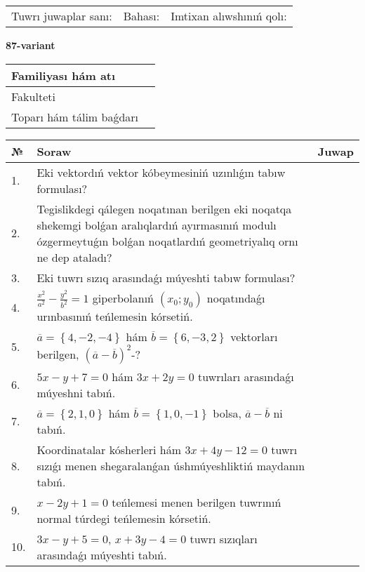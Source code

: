 \documentclass{article}
\begin{document}
\vspace{1cm}

\begin{tabular}{lll}
Tuwrı juwaplar sanı: \underline{\hspace{1.5cm}} & 
Bahası: \underline{\hspace{1.5cm}} & 
Imtixan alıwshınıń qolı: \underline{\hspace{2cm}} \\
\end{tabular}

\egroup

\newpage


\textbf{87-variant}\\

\bgroup
\def\arraystretch{1.6} %

\begin{tabular}{|m{5.7cm}|m{9.5cm}|}
\hline
Familiyası hám atı & \\
\hline
Fakulteti  & \\
\hline
Toparı hám tálim baǵdarı  & \\
\hline
\end{tabular}

\vspace{1cm}

\begin{tabular}{|m{0.7cm}|m{10cm}|m{4cm}|}
\hline
№ & Soraw & Juwap \\
\hline
1. & Eki vektordıń vektor kóbeymesiniń uzınlıǵın tabıw formulası? &  \\
\hline
2. & Tegislikdegi qálegen noqatınan berilgen eki noqatqa shekemgi bolǵan aralıqlardıń ayırmasınıń modulı ózgermeytuǵın bolǵan noqatlardıń geometriyalıq ornı ne dep ataladı? &  \\
\hline
3. & Eki tuwrı sızıq arasındaǵı múyeshti tabıw formulası? &  \\
\hline
4. & $\frac{x^2}{a^2}-\frac{y^2}{b^2}=1$ giperbolanıń $(x_0;y_0)$ noqatındaǵı urınbasınıń teńlemesin kórsetiń. &  \\
\hline
5. & $\overline{a}=\left\{ 4,-2,-4 \right\}$ hám $\overline{b}=\left\{ 6,-3, 2 \right\}$ vektorları berilgen, $(\overline{a}-\overline{b}) ^{2}$-? &  \\
\hline
6. & $5x-y+7=0$ hám $3x+2y=0$ tuwrıları arasındaǵı múyeshni tabıń. &  \\
\hline
7. & $\overline{a}=\left\{ 2, 1, 0 \right\}$ hám $\overline{b}=\left\{ 1, 0,-1 \right\}$ bolsa, $\overline{a}-\overline{b}$ ni tabıń. &  \\
\hline
8. & Koordinatalar kósherleri hám $ 3x+4y-12=0 $ tuwrı sızıǵı menen shegaralanǵan úshmúyeshliktiń maydanın tabıń. &  \\
\hline
9. & $x-2y+1=0$ teńlemesi menen berilgen tuwrınıń normal túrdegi teńlemesin kórsetiń. &  \\
\hline
10. & $3x-y+5=0$, $x+3y-4=0$ tuwrı sızıqları arasındaǵı múyeshti tabıń. &  \\
\hline
\end{tabular}
\end{document}
